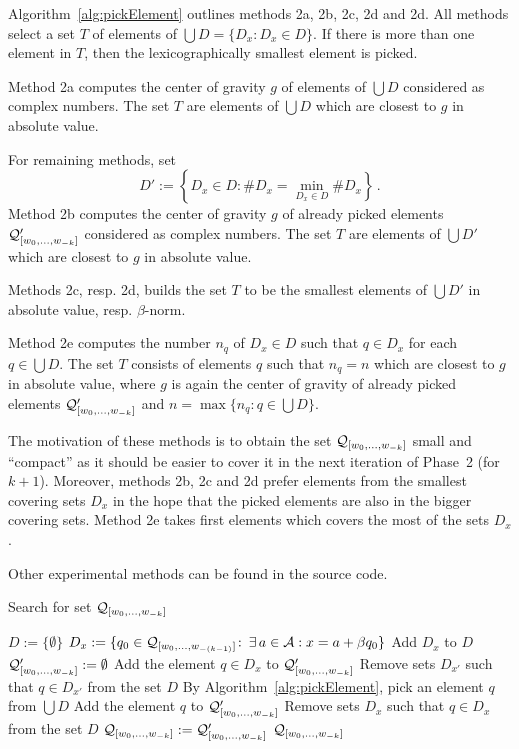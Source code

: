 Algorithm~\ref{alg:pickElement} outlines methods 2a, 2b, 2c, 2d and 2d. All methods select a set $T$ of elements of $\bigcup D = \{D_x \colon D_x \in D\}$. If there is more than one element in $T$, then the lexicographically smallest element is picked.

Method 2a computes the center of gravity $g$ of elements of $\bigcup D$ considered as complex numbers. The set $T$ are elements of  $\bigcup D$ which are closest to $g$ in absolute value. 

For remaining methods, set
$$D':=\left\{D_x \in D \colon \#D_x=\min_{D_x\in D} \#D_x \right\}\,.$$
Method 2b computes the center of gravity $g$ of already picked elements $\mathcal{Q}_{[w_{0}, \dots, w_{-k}]}'$ considered as complex numbers. The set $T$ are elements of  $\bigcup D'$ which are closest to $g$ in absolute value. 

Methods 2c, resp. 2d, builds the set $T$ to be the smallest elements of  $\bigcup D'$ in absolute value, resp.  $\beta$-norm. 

Method 2e computes the number $n_q$ of $D_x\in D$ such that $q\in D_x$ for each $q \in \bigcup D$. The set $T$ consists of elements $q$ such that $n_q=n$ which are closest to $g$ in absolute value, where $g$ is again the center of gravity of already picked elements $\mathcal{Q}_{[w_{0}, \dots, w_{-k}]}'$ and $n=\max\{n_q\colon q\in \bigcup D\}$.

The motivation of these methods is to obtain the set $\mathcal{Q}_{[w_{0}, \dots, w_{-k}]}$ small and ``compact'' as it should be easier to cover it in the next iteration of Phase~2 (for $k+1$). Moreover, methods 2b, 2c and 2d prefer elements from the smallest covering sets $D_x$ in the hope that the picked elements are also in the bigger covering sets. Method 2e takes first elements which covers the most of the sets $D_x$.

Other experimental methods can be found in the source code. 

\begin{algorithm}
  \caption{Search for set $\mathcal{Q}_{[w_{0}, \dots, w_{-k}]}$ }
    \label{alg:minimalSet}
  \begin{algorithmic}[1]
    \STATE $D:=\{\emptyset\}$
    	\STATE $D_x:= \{q_0\in\mathcal{Q}_{[w_{0}, \dots, w_{-(k-1)}]}\colon\, \exists \, a\in\mathcal{A}: x=a+\beta q_0 \}$
        \STATE Add $D_x$ to $D$
    \ENDFOR
    \STATE $\mathcal{Q}_{[w_{0}, \dots, w_{-k}]}':=\emptyset$
    		\STATE Add the element $q\in D_x$ to $\mathcal{Q}_{[w_{0}, \dots, w_{-k}]}'$
	        \STATE Remove sets $D_{x'}$ such that $q \in D_{x'}$  from the set $D$ 
	    \ENDIF
	\ENDFOR
        \STATE By Algorithm~\ref{alg:pickElement},  pick an element $q$ from $\bigcup D$
        \STATE Add the element $q$ to $\mathcal{Q}_{[w_{0}, \dots, w_{-k}]}'$
        \STATE Remove sets $D_x$ such that $q \in D_x$  from the set $D$ 
    \ENDWHILE
	\STATE $\mathcal{Q}_{[w_{0}, \dots, w_{-k}]}:=\mathcal{Q}_{[w_{0}, \dots, w_{-k}]}'$
    \RETURN $\mathcal{Q}_{[w_{0}, \dots, w_{-k}]}$
  \end{algorithmic}
\end{algorithm}


